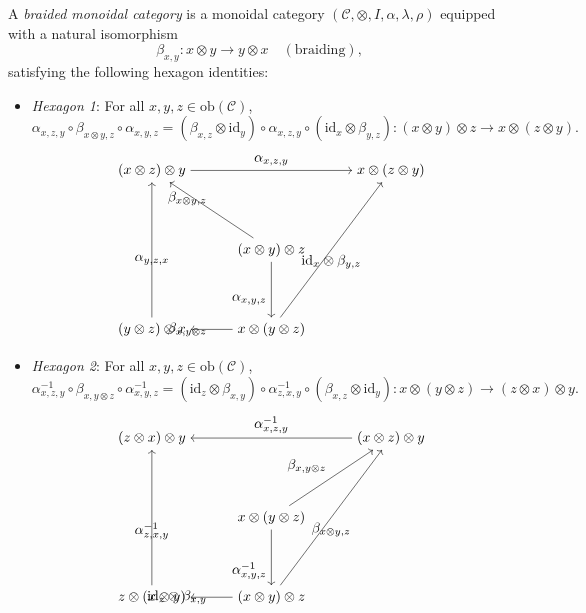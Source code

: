 \documentclass{article}
\begin{document}
\begin{definition}
A \emph{braided monoidal category} is a monoidal category $(\mathcal{C}, \otimes, I, \alpha, \lambda, \rho)$ equipped with a natural isomorphism
\[
\beta_{x,y} : x \otimes y \to y \otimes x \quad (\text{braiding}),
\]
satisfying the following hexagon identities:
\begin{itemize}
    \item \emph{Hexagon 1}: For all $x, y, z \in \mathrm{ob}(\mathcal{C})$,
    \[
    \alpha_{x,z,y} \circ \beta_{x \otimes y, z} \circ \alpha_{x,y,z} = (\beta_{x,z} \otimes \mathrm{id}_y) \circ \alpha_{x,z,y} \circ (\mathrm{id}_x \otimes \beta_{y,z}) : (x \otimes y) \otimes z \to x \otimes (z \otimes y).
    \]
    \[
    \begin{tikzpicture}
        \node (center) at (0,0) {$(x \otimes y) \otimes z$};
        \node (topleft) at (-3,2) {$(x \otimes z) \otimes y$};
        \node (topright) at (3,2) {$x \otimes (z \otimes y)$};
        \node (bottomleft) at (-3,-2) {$(y \otimes z) \otimes x$};
        \node (bottomcenter) at (0,-2) {$x \otimes (y \otimes z)$};
        \draw[->] (center) to node[above left] {$\beta_{x \otimes y, z}$} (topleft);
        \draw[->] (center) to node[below left] {$\alpha_{x,y,z}$} (bottomcenter);
        \draw[->] (topleft) to node[above] {$\alpha_{x,z,y}$} (topright);
        \draw[->] (bottomcenter) to node[below] {$\mathrm{id}_x \otimes \beta_{y,z}$} (topright);
        \draw[->] (bottomcenter) to node[left] {$\beta_{x,y \otimes z}$} (bottomleft);
        \draw[->] (bottomleft) to node[below] {$\alpha_{y,z,x}$} (topleft);
    \end{tikzpicture}
    \]
    \item \emph{Hexagon 2}: For all $x, y, z \in \mathrm{ob}(\mathcal{C})$,
    \[
    \alpha_{x,z,y}^{-1} \circ \beta_{x, y \otimes z} \circ \alpha_{x,y,z}^{-1} = (\mathrm{id}_z \otimes \beta_{x,y}) \circ \alpha_{z,x,y}^{-1} \circ (\beta_{x,z} \otimes \mathrm{id}_y) : x \otimes (y \otimes z) \to (z \otimes x) \otimes y.
    \]
    \[
    \begin{tikzpicture}
        \node (center) at (0,0) {$x \otimes (y \otimes z)$};
        \node (topleft) at (-3,2) {$(z \otimes x) \otimes y$};
        \node (topright) at (3,2) {$(x \otimes z) \otimes y$};
        \node (bottomleft) at (-3,-2) {$z \otimes (x \otimes y)$};
        \node (bottomcenter) at (0,-2) {$(x \otimes y) \otimes z$};
        \draw[->] (center) to node[above left] {$\beta_{x, y \otimes z}$} (topright);
        \draw[->] (center) to node[below left] {$\alpha_{x,y,z}^{-1}$} (bottomcenter);
        \draw[->] (topright) to node[above] {$\alpha_{x,z,y}^{-1}$} (topleft);
        \draw[->] (bottomcenter) to node[below] {$\beta_{x \otimes y, z}$} (topright);
        \draw[->] (bottomcenter) to node[left] {$\mathrm{id}_z \otimes \beta_{x,y}$} (bottomleft);
        \draw[->] (bottomleft) to node[below] {$\alpha_{z,x,y}^{-1}$} (topleft);
    \end{tikzpicture}
    \]
\end{itemize}
\end{definition}
\end{document}
